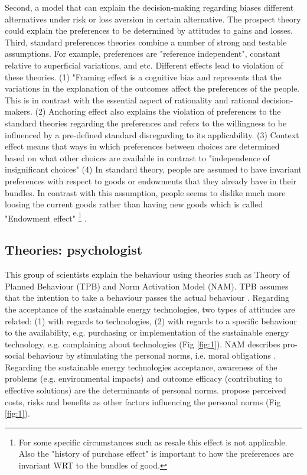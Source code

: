 \documentclass[preprint,12pt,3p]{elsarticle}
\begin{document}
Second, a model that can explain the decision-making regarding biases different alternatives under risk or loss aversion in certain alternative. The prospect theory could explain the preferences to be determined by attitudes to gains and losses. Third, standard preferences theories combine a number of strong and testable assumptions. For example, preferences are "reference independent", constant relative to superficial variations, and etc. Different effects lead to violation of these theories. (1) "Framing effect is a cognitive bias and represents that the variations in the explanation of the outcomes affect the preferences of the people. This is in contrast with the essential aspect of rationality and rational decision-makers. (2) Anchoring effect also explains the violation of preferences to the standard theories regarding the preferences and refers to the willingness to be influenced by a pre-defined standard disregarding to its applicability. (3) Context effect means that ways in which preferences between choices are determined based on what other choices are available in contrast to  "independence of insignificant choices" (4) In standard theory, people are assumed to have invariant preferences  with respect to goods or endowments that they already have in their bundles. In contrast with this assumption, people seems to dislike much more loosing the current goods rather than having new goods which is called "Endowment effect" \footnote{For some specific circumstances such as resale this effect is not applicable. Also the "history of purchase effect" is important to how the preferences are invariant WRT to the bundles of good.}  \citep{klotz2010, kahneman2003, camerer2004}. 


\subsection{Theories: psychologist} 

This group of scientists explain the behaviour using theories such as Theory of Planned Behaviour (TPB) and Norm Activation Model (NAM). TPB assumes that the intention to take a behaviour passes the actual behaviour \citep{ajzen1991}. Regarding the acceptance of the sustainable energy technologies, two types of attitudes are related: (1) with regards to technologies, (2) with regards to a specific behaviour to the availability, e.g. purchasing or implementation of the sustainable energy technology, e.g. complaining about technologies (Fig \ref{fig:1}). NAM describes pro-social behaviour by stimulating the personal norms, i.e. moral obligations \citep{schwartz1977}. Regarding the sustainable energy technologies acceptance, awareness of the problems (e.g. environmental impacts) and outcome efficacy (contributing to effective solutions) are the determinants of personal norms. \citeauthor{huijts2012} propose perceived costs, risks and benefits as other factors influencing the personal norms (Fig \ref{fig:1}). 
\end{document}
